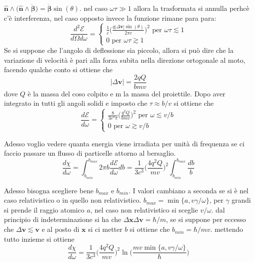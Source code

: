 \documentclass[11pt,a4paper]{report}
\newcommand{\vettore}[1]{\mathbf{#1}}
\newcommand{\pvet}[2]{#1\wedge #2}
\begin{document}
		$\pvet{\hat{\vettore n}}{\big(\pvet{\hat{\vettore n}}{\dot{\vettore \beta}}\big)}=\dot{\vettore \beta}\sin(\theta)$.\newline
		nel caso $\omega\tau\gg1$ allora la trasformata si annulla perhcè c'è interferenza, nel caso opposto invece la funzione rimane para para: 
		\begin{equation}
			\frac{d^2\mathcal{E}}{d\Omega d\omega}=
			\begin{cases}
				\frac1c \Big(\frac{q|\Delta \vettore v|\sin(\theta)}{2\pi c}\Big)^2\textrm{ per } \omega\tau\lesssim 1 \\
				0 \textrm{ per }\omega\tau\gtrsim 1
			\end{cases}
		\end{equation}
		Se si suppone che l'angolo di deflessione sia piccolo, allora si può dire che la variazione di velocità è pari alla forza subita nella direzione ortogonale al moto, facendo qualche conto si ottiene che 
		\[
			|\Delta \vettore v|=\frac{2qQ}{bmv}
		\]
		dove $Q$ è la massa del coso colpito e m la massa del proiettile. Dopo aver integrato in tutti gli angoli solidi e imposto che $\tau\approx b/v$ si ottiene che 
		\begin{equation}
			\frac{d\mathcal{E}}{d\omega}=
			\begin{cases}
				\frac8{3c^3\pi }\Big(\frac{q^2Q}{bmv}\Big)^2\textrm{ per } \omega\lesssim v/b \\
				0 \textrm{ per }\omega\gtrsim v/b
			\end{cases}
		\end{equation}

		Adesso voglio vedere quanta energia viene irradiata per unità di frequenza se ci faccio passare un flusso di particelle attorno al bersaglio.\newline
		\begin{equation}
			\frac{d\chi}{d\omega}=\int_{b_{min}}^{b_{max}}2\pi b  \frac{d\mathcal{E}}{d\omega}db=\frac1{3c^3 }\Big(\frac{4q^2Q}{mv}\Big)^2\int_{b_{min}}^{b_{max}} \frac{db}b
		\end{equation}

		Adesso bisogna scegliere bene $b_{max}$ e $b_{min}$.\newline
		I valori cambiano a seconda se si è nel caso relativistico o in quello non relativistico.\newline
		$b_{max}=\min\{a,v\gamma/\omega\}$, per $\gamma$ grandi si prende il raggio atomico $a$, nel caso non relativistico si sceglie $v/\omega$.\newline
		dal principio di indeterminazione si ha che $\Delta \vettore x\Delta \vettore v=\hbar/m$, se si suppone per eccesso che $\Delta \vettore v\lesssim \vettore v$ e al posto di $\vettore x $ si ci metter $b$ si ottiene che $b_{min}=\hbar/mv$.\newline
		mettendo tutto inzieme si ottiene 
		\begin{equation}
			\frac{d\chi}{d\omega}=\frac1{3c^3 }\Big(\frac{4q^2Q}{mv}\Big)^2
			\ln\bigg(\frac{mv\min\{a,v\gamma/\omega\}}{\hbar}\bigg)
		\end{equation}

	
\end{document}
